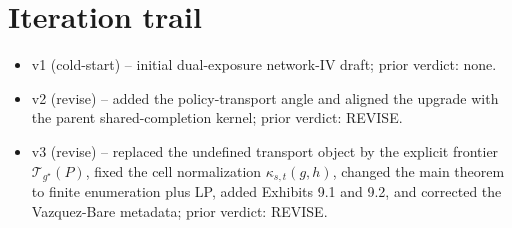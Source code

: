 \documentclass[11pt]{article}
\theoremstyle{definition}
\theoremstyle{plain}
\theoremstyle{remark}
\begin{document}
\section{Iteration trail}
\begin{itemize}[leftmargin=*]
\item v1 (cold-start) -- initial dual-exposure network-IV draft; prior verdict: none.
\item v2 (revise) -- added the policy-transport angle and aligned the upgrade with the parent shared-completion kernel; prior verdict: REVISE.
\item v3 (revise) -- replaced the undefined transport object by the explicit frontier \(\mathcal T_{g^\star}(P)\), fixed the cell normalization \(\kappa_{s,t}(g,h)\), changed the main theorem to finite enumeration plus LP, added Exhibits 9.1 and 9.2, and corrected the Vazquez-Bare metadata; prior verdict: REVISE.
\end{itemize}
\end{document}
